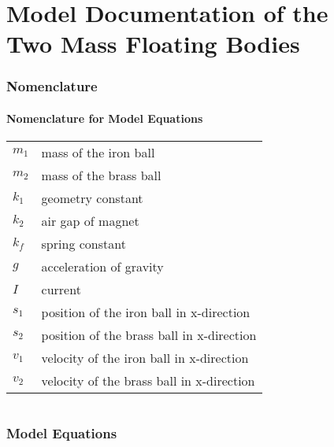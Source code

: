 \documentclass[10pt,a4paper]{article}
\begin{document}
	\part*{Model Documentation of the \\ Two Mass Floating Bodies} %
	
	
	
	
	\section{Nomenclature} %
	\subsection{Nomenclature for Model Equations} %
	
	\begin{tabular}{ll}
		$m_1$ & mass of the iron ball \\
		$m_2$ & mass of the brass ball \\
		$k_1$ & geometry constant \\
		$k_2$ & air gap of magnet \\
		$k_f$ & spring constant \\
		$g$ & acceleration of gravity \\
		$I$ & current \\
		$s_1$ & position of the iron ball in x-direction \\
		$s_2$ & position of the brass ball in x-direction \\		
		$v_1$ & velocity of the iron ball in x-direction \\
		$v_2$ & velocity of the brass ball in x-direction \\		
	\end{tabular}
	 
	
	\begin{tabular}{ll}

	\end{tabular}
	
	
	\section{Model Equations} %
	
\end{document}
